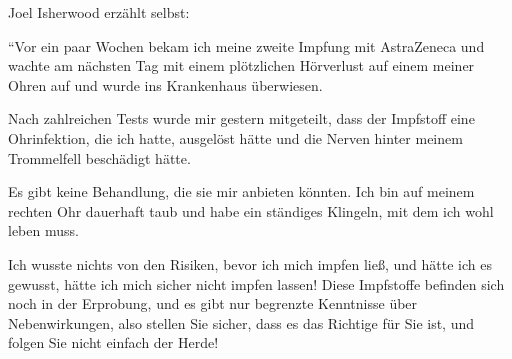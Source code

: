 Joel Isherwood erzählt selbst:

``Vor ein paar Wochen bekam ich meine zweite Impfung mit AstraZeneca und wachte
am nächsten Tag mit einem plötzlichen Hörverlust auf einem meiner Ohren auf und
wurde ins Krankenhaus überwiesen.

Nach zahlreichen Tests wurde mir gestern mitgeteilt, dass der Impfstoff eine
Ohrinfektion, die ich hatte, ausgelöst hätte und die Nerven hinter meinem
Trommelfell beschädigt hätte.

Es gibt keine Behandlung, die sie mir anbieten könnten. Ich bin auf meinem
rechten Ohr dauerhaft taub und habe ein ständiges Klingeln, mit dem ich wohl
leben muss.

Ich wusste nichts von den Risiken, bevor ich mich impfen ließ, und hätte ich es
gewusst, hätte ich mich sicher nicht impfen lassen! Diese Impfstoffe befinden
sich noch in der Erprobung, und es gibt nur begrenzte Kenntnisse über
Nebenwirkungen, also stellen Sie sicher, dass es das Richtige für Sie ist, und
folgen Sie nicht einfach der Herde!
